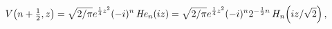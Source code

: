 \[\mathop{V\/}\nolimits\!\left(n+\tfrac{1}{2},z\right)=\sqrt{2/\pi}e^{\frac{1}{4%
}z^{2}}(-i)^{n}\mathop{\mathit{He}_{n}\/}\nolimits\!\left(iz\right)=\sqrt{2/%
\pi}e^{\frac{1}{4}z^{2}}(-i)^{n}2^{-\frac{1}{2}n}\mathop{H_{n}\/}\nolimits\!%
\left(iz/\sqrt{2}\right),\]